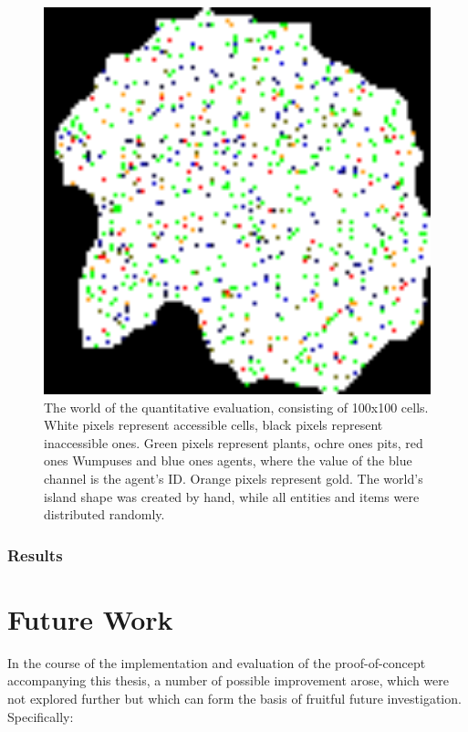 \begin{figure}
	\centering
	\includegraphics[width=400pt]{Figs/evalWorldQuant.png}
	\caption{The world of the quantitative evaluation, consisting of 100x100 cells. White pixels represent accessible cells, black pixels represent inaccessible ones. Green pixels represent plants, ochre ones pits, red ones Wumpuses and blue ones agents, where the value of the blue channel is the agent's ID. Orange pixels represent gold. The world's island shape was created by hand, while all entities and items were distributed randomly.}
	\label{fig:evalWorldQuant}
\end{figure}

\subsubsection{Results}

\section{Future Work}\label{sec:futureWork}

In the course of the implementation and evaluation of the proof-of-concept accompanying this thesis, a number of possible improvement arose, which were not explored further but which can form the basis of fruitful future investigation. Specifically:


